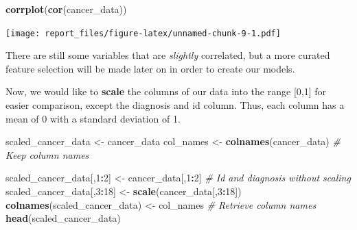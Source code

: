 \documentclass[
]{article}
\newenvironment{Shaded}{\begin{snugshade}}{\end{snugshade}}
\newcommand{\CommentTok}[1]{\textcolor[rgb]{0.56,0.35,0.01}{\textit{#1}}}
\newcommand{\DecValTok}[1]{\textcolor[rgb]{0.00,0.00,0.81}{#1}}
\newcommand{\KeywordTok}[1]{\textcolor[rgb]{0.13,0.29,0.53}{\textbf{#1}}}
\newcommand{\NormalTok}[1]{#1}
\newcommand{\OperatorTok}[1]{\textcolor[rgb]{0.81,0.36,0.00}{\textbf{#1}}}
\newcommand{\StringTok}[1]{\textcolor[rgb]{0.31,0.60,0.02}{#1}}
\begin{document}
\begin{Shaded}
\begin{Highlighting}[]
\KeywordTok{corrplot}\NormalTok{(}\KeywordTok{cor}\NormalTok{(cancer_data))}
\end{Highlighting}
\end{Shaded}

\texttt{[image: report\_files/figure-latex/unnamed-chunk-9-1.pdf]}

There are still some variables that are \emph{slightly} correlated, but
a more curated feature selection will be made later on in order to
create our models.

Now, we would like to \textbf{scale} the columns of our data into the
range {[}0,1{]} for easier comparison, except the diagnosis and id
column. Thus, each column has a mean of 0 with a standard deviation of
1.

\begin{Shaded}
\begin{Highlighting}[]
\NormalTok{scaled_cancer_data <-}\StringTok{ }\NormalTok{cancer_data}
\NormalTok{col_names <-}\StringTok{ }\KeywordTok{colnames}\NormalTok{(cancer_data) }\CommentTok{# Keep column names}

\NormalTok{scaled_cancer_data[,}\DecValTok{1}\OperatorTok{:}\DecValTok{2}\NormalTok{] <-}\StringTok{ }\NormalTok{cancer_data[,}\DecValTok{1}\OperatorTok{:}\DecValTok{2}\NormalTok{] }\CommentTok{# Id and diagnosis without scaling}
\NormalTok{scaled_cancer_data[,}\DecValTok{3}\OperatorTok{:}\DecValTok{18}\NormalTok{] <-}\StringTok{ }\KeywordTok{scale}\NormalTok{(cancer_data[,}\DecValTok{3}\OperatorTok{:}\DecValTok{18}\NormalTok{])}
\KeywordTok{colnames}\NormalTok{(scaled_cancer_data) <-}\StringTok{ }\NormalTok{col_names }\CommentTok{# Retrieve column names}
\KeywordTok{head}\NormalTok{(scaled_cancer_data)}
\end{Highlighting}
\end{Shaded}
\end{document}
